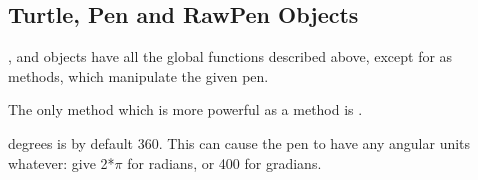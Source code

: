 \subsection{Turtle, Pen and RawPen Objects \label{pen-rawpen-objects}}

,  and  objects have all the
global functions described above, except for  as
methods, which manipulate the given pen.

The only method which is more powerful as a method is
.

\begin{methoddesc}{degrees}{}
 is by default 360. This can cause the pen to have any
angular units whatever: give  2*$\pi$ for radians, or
400 for gradians.
\end{methoddesc}
